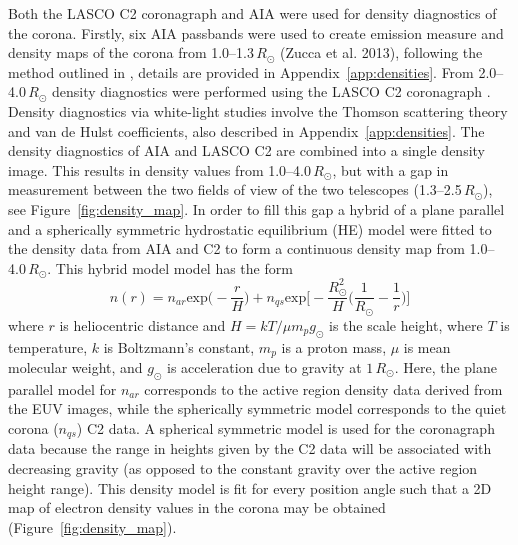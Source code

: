 Both the LASCO C2 coronagraph and AIA were used for density diagnostics of the corona. Firstly, six AIA passbands were used to create emission measure and density maps of the corona from 1.0--1.3\,$R_{\odot}$ (Zucca et al. 2013), following the method outlined in \citet{asch2013}, details are provided in Appendix~\ref{app:densities}. From 2.0--4.0\,$R_{\odot}$ density diagnostics were performed using the LASCO C2 coronagraph \citep{vdeh50}. Density diagnostics via white-light studies involve the Thomson scattering theory and van de Hulst coefficients, also described in Appendix~\ref{app:densities}. The density diagnostics of AIA and LASCO C2 are combined into a single density image. This results in density values from 1.0--4.0\,$R_{\odot}$, but with a gap in measurement between the two fields of view of the two telescopes (1.3--2.5\,$R_{\odot}$), see Figure~\ref{fig:density_map}. In order to fill this gap a hybrid of a plane parallel and a spherically symmetric hydrostatic equilibrium (HE) model were fitted to the density data from AIA and C2 to form a continuous density map from 1.0--4.0\,$R_{\odot}$. This hybrid model model has the form
\begin{equation}
	n(r) = n_{ar}\mathrm{exp}\bigg(-\frac{r}{H}\bigg) + n_{qs}\mathrm{exp}\bigg[-\frac{R_{\odot}^2}{H} \bigg(\frac{1}{R_{\odot}}-\frac{1}{r}\bigg)\bigg]
	\label{eqn:hybrid_hydro}
\end{equation}
where $r$ is heliocentric distance and $H=kT/\mu m_pg_{\odot}$ is the scale height, where $T$ is temperature, $k$ is Boltzmann's constant, $m_p$ is a proton mass, $\mu$ is mean molecular weight, and $g_{\odot}$ is acceleration due to gravity at $1\,R_{\odot}$. Here, the plane parallel model for $n_{ar}$ corresponds to the active region density data derived from the EUV images, while the spherically symmetric model corresponds to the quiet corona ($n_{qs}$) C2 data. A spherical symmetric model is used for the coronagraph data because the range in heights given by the C2 data will be associated with decreasing gravity (as opposed to the constant gravity over the active region height range). This density model is fit for every position angle such that a 2D map of electron density values in the corona may be obtained (Figure~\ref{fig:density_map}).
